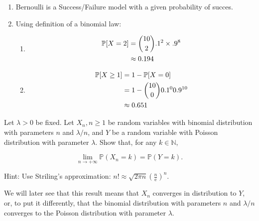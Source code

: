 \begin{solution}
  \begin{enumerate}
    \item Bernoulli is a Success/Failure model with a given probability of succes.
    \item Using definition of a binomial law:
          \begin{enumerate}
            \item \begin{align*}
                    \mathbb{P}[X = 2] & = \binom{10}{2} .1^2 \times .9^8 \\
                                  & \approx 0.194
                  \end{align*}
            \item \begin{align*}
                    \mathbb{P}[X \geq 1] & = 1 - \mathbb{P}[X = 0]                \\
                                     & = 1 - \binom{10}{0} 0.1^0 0.9^{10} \\
                                     & \approx 0.651
                  \end{align*}
          \end{enumerate}
  \end{enumerate}
\end{solution}

\begin{Exercise}
  Let $\lambda>0$ be fixed. Let $X_{n}, n \geq 1$ be random variables with binomial distribution with parameters $n$ and $\lambda / n$, and $Y$ be a random variable with Poisson distribution with parameter $\lambda$. Show that, for any $k \in \mathbb{N}$,

  \[
    \lim _{n \rightarrow+\infty} \mathbb{P}\left(X_{n}=k\right)=\mathbb{P}(Y=k) .
  \]

  Hint: Use Striling's approximation: $n ! \approx \sqrt{2 \pi n}{\left(\frac{n}{\mathrm{e}}\right)}^{n}$.

  We will later see that this result means that $X_{n}$ converges in distribution to $Y$, or, to put it differently, that the binomial distribution with parameters $n$ and $\lambda / n$ converges to the Poisson distribution with parameter $\lambda$.
\end{Exercise}

